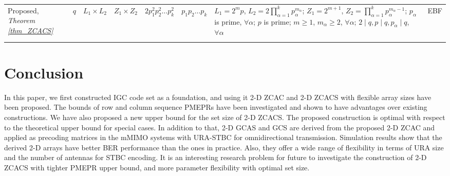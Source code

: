 \documentclass[pdflatex,sn-mathphys-num]{sn-jnl}%
\theoremstyle{thmstyleone}
\begin{document}
\begin{table}
\begin{tabular*}{\textwidth}{@{}llllllll@{}}
			\hline
			\makecell[l]{Proposed,\\ \textit{Theorem \ref{thm_ZCACS}} } & $q$  & $L_1 \times L_2$ & $Z_1  \times Z_2$ & $2 p_1^2 p_2^2 \dots p_k^2$ & $p_1 p_2 \dots p_k$ & \makecell[l]{$L_1= 2^m p$,  \\$L_2= 2 \prod_{\alpha=1}^{k} p_\alpha^{m_\alpha}$; \\$Z_1=2^{m+1}$, \\$Z_2= \prod_{\alpha=1}^{k} p_\alpha^{m_\alpha-1} $;\\  $p_\alpha$ is prime, $\forall \alpha$; \\$p$ is prime; $m \geq 1$,  \\$m_\alpha \geq 2$, $\forall \alpha$;  \\$2 \mid q, p \mid q, p_\alpha \mid q$, $\forall \alpha$ } & EBF\\
			\botrule
		\end{tabular*}
		\label{table_comparison_ZCACS}
	\end{table}
	
	\section{Conclusion}\label{sec8}
	In this paper, we first constructed IGC code set as a foundation, and using it 2-D ZCAC and 2-D ZCACS with flexible array sizes have been proposed. The bounds of row and column sequence PMEPRs have been investigated and shown to have advantages over existing constructions. 
	We have also proposed a new upper bound for the set size of 2-D ZCACS. The proposed construction is optimal with respect to the theoretical upper bound for special cases. In addition to that, 2-D GCAS and GCS are derived from the proposed 2-D ZCAC and applied as precoding matrices in the mMIMO systems with URA-STBC for omnidirectional transmission. Simulation results show that the derived 2-D arrays have better BER performance than the ones in practice. Also, they offer a wide range of flexibility in terms of URA size and the number of antennas for STBC encoding. It is an interesting research problem for future to investigate the construction of 2-D ZCACS with tighter PMEPR upper bound, and more parameter flexibility with optimal set size.
	
	\backmatter
	
	
	
	
	
	
	
	
\end{document}
